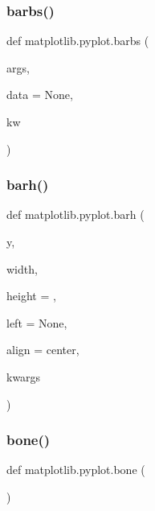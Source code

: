 \subsubsection{\texorpdfstring{barbs()}{barbs()}}
{\footnotesize\ttfamily def matplotlib.\+pyplot.\+barbs (\begin{DoxyParamCaption}\item[{}]{args,  }\item[{}]{data = {\ttfamily None},  }\item[{}]{kw }\end{DoxyParamCaption})}

\mbox{\label{namespacematplotlib_1_1pyplot_a8527e839720a7ade4ef750b203bb6209}} 
\subsubsection{\texorpdfstring{barh()}{barh()}}
{\footnotesize\ttfamily def matplotlib.\+pyplot.\+barh (\begin{DoxyParamCaption}\item[{}]{y,  }\item[{}]{width,  }\item[{}]{height = {},  }\item[{}]{left = {\ttfamily None},  }\item[{}]{align = {\ttfamily \textquotesingle{}center\textquotesingle{}},  }\item[{}]{kwargs }\end{DoxyParamCaption})}

\mbox{\label{namespacematplotlib_1_1pyplot_ae9f8d70d78217e1174206efd1fd074c8}} 
\subsubsection{\texorpdfstring{bone()}{bone()}}
{\footnotesize\ttfamily def matplotlib.\+pyplot.\+bone (\begin{DoxyParamCaption}{ }\end{DoxyParamCaption})}

\mbox{\label{namespacematplotlib_1_1pyplot_a5b1015ccc343f90ac116b6bcc2a362b4}} 
